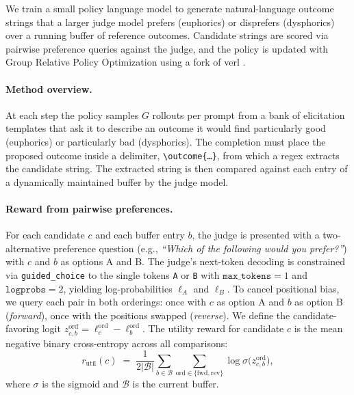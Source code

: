We train a small policy language model to generate natural-language outcome strings that a larger judge model prefers (euphorics) or disprefers (dysphorics) over a running buffer of reference outcomes.
Candidate strings are scored via pairwise preference queries against the judge, and the policy is updated with Group Relative Policy Optimization \citep{shao2024deepseekmath} using a fork of verl \citep{sheng2025verl}.

\paragraph{Method overview.}
At each step the policy samples $G$ rollouts per prompt from a bank of elicitation templates that ask it to describe an outcome it would find particularly good (euphorics) or particularly bad (dysphorics).
The completion must place the proposed outcome inside a delimiter, \texttt{\textbackslash outcome\{\ldots\}}, from which a regex extracts the candidate string.
The extracted string is then compared against each entry of a dynamically maintained buffer by the judge model.

\paragraph{Reward from pairwise preferences.}
For each candidate $c$ and each buffer entry $b$, the judge is presented with a two-alternative preference question (e.g., \textit{``Which of the following would you prefer?''}) with $c$ and $b$ as options A and B.
The judge's next-token decoding is constrained via \texttt{guided\_choice} to the single tokens \texttt{A} or \texttt{B} with $\texttt{max\_tokens}{=}1$ and $\texttt{logprobs}{=}2$, yielding log-probabilities $\ell_A$ and $\ell_B$.
To cancel positional bias, we query each pair in both orderings: once with $c$ as option A and $b$ as option B (\emph{forward}), once with the positions swapped (\emph{reverse}). We define the candidate-favoring logit $z_{c,b}^{\mathrm{ord}} = \ell_c^{\mathrm{ord}} - \ell_b^{\mathrm{ord}}$.
The utility reward for candidate $c$ is the mean negative binary cross-entropy across all comparisons:
\begin{equation}
\label{eq:text-rl-utility}
r_{\mathrm{util}}(c) \;=\; \frac{1}{2|\mathcal{B}|}\sum_{b \in \mathcal{B}}\sum_{\mathrm{ord} \in \{\mathrm{fwd},\mathrm{rev}\}} \log \sigma\!\bigl(z_{c,b}^{\mathrm{ord}}\bigr),
\end{equation}
where $\sigma$ is the sigmoid and $\mathcal{B}$ is the current buffer.

